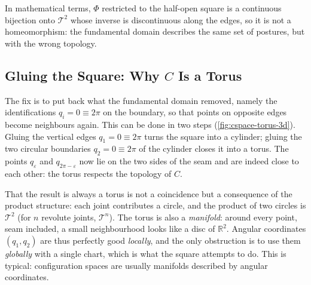 In mathematical terms, \( \Phi \) restricted to the half-open square is a
continuous bijection onto \( \mathcal{T}^2 \) whose inverse is
discontinuous along the edges, so it is not a homeomorphism: the fundamental
domain describes the same set of postures, but with the wrong topology.

\subsection{Gluing the Square: Why \( C \) Is a Torus}
\label{subsec:cspace-gluing}

The fix is to put back what the fundamental domain removed, namely the
identifications \( q_i = 0 \equiv 2\pi \) on the boundary, so that points
on opposite edges become neighbours again. This can be done in two steps
(\cref{fig:cspace-torus-3d}). Gluing the vertical edges
\( q_1 = 0 \equiv 2\pi \) turns the square into a cylinder; gluing the
two circular boundaries \( q_2 = 0 \equiv 2\pi \) of the cylinder closes it
into a torus. The points \( q_\varepsilon \) and \( q_{2\pi-\varepsilon} \)
now lie on the two sides of the seam and are indeed close to each other:
the torus respects the topology of \( C \).

That the result is always a torus is not a coincidence but a consequence of
the product structure: each joint contributes a circle, and the product of
two circles is \( \mathcal{T}^2 \) (for \( n \) revolute joints,
\( \mathcal{T}^n \)). The torus is also a \emph{manifold}: around every
point, seam included, a small neighbourhood looks like a disc of
\( \mathbb{R}^2 \). Angular coordinates \( (q_1, q_2) \) are thus perfectly
good \emph{locally}, and the only obstruction is to use them
\emph{globally} with a single chart, which is what the square attempts to
do. This is typical: configuration spaces are usually manifolds described
by angular coordinates.

